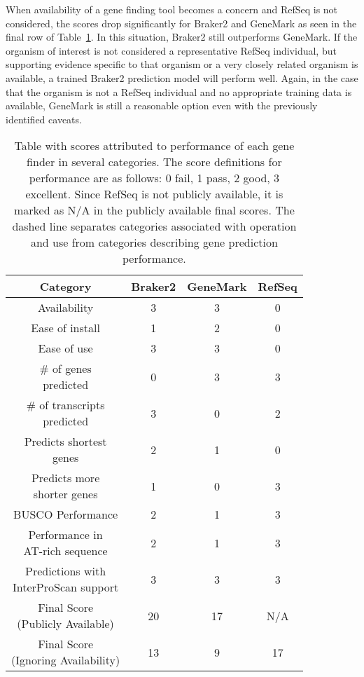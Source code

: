 When availability of a gene finding tool becomes a concern and RefSeq
is not considered, the scores drop significantly for Braker2 and
GeneMark as seen in the final row of Table~\ref{table:final-score}. In
this situation, Braker2 still outperforms GeneMark. If the organism of
interest is not considered a representative RefSeq individual, but
supporting evidence specific to that organism or a very closely
related organism is available, a trained Braker2 prediction model will
perform well. Again, in the case that the organism is not a RefSeq
individual and no appropriate training data is available, GeneMark is
still a reasonable option even with the previously identified caveats.

\begin{table}
  \centering
  \begin{tabular}{|c|c|c|c|}
    \hline
    Category & Braker2 & GeneMark & RefSeq \\ \hline
    Availability & 3 & 3 & 0 \\ \hline
    Ease of install & 1 & 2 & 0 \\ \hline
    Ease of use & 3 & 3 & 0 \\ \hdashline
    \makecell{\# of genes\\predicted} & 0 & 3 & 3 \\ \hline
    \makecell{\# of transcripts\\predicted} & 3 & 0 & 2 \\ \hline
    \makecell{Predicts shortest\\genes} & 2 & 1 & 0 \\ \hline
    \makecell{Predicts more\\shorter genes} & 1 & 0 & 3 \\ \hline
    BUSCO Performance & 2 & 1 & 3 \\ \hline
    \makecell{Performance in\\AT-rich sequence} & 2 & 1 & 3 \\ \hline
    \makecell{Predictions with \\InterProScan support} & 3 & 3 & 3 \\ \hline
    \makecell{Final Score\\(Publicly Available)} & 20 & 17 & N/A \\ \hline
    \makecell{Final Score\\(Ignoring Availability)} & 13 & 9 & 17 \\ \hline
  \end{tabular}
  \caption[Final scoring table]{Table with scores attributed to
    performance of each gene finder in several categories. The score
    definitions for performance are as follows: 0 \- fail, 1 \- pass, 2
    \- good, 3 \- excellent. Since RefSeq is not publicly available, it is
    marked as N/A in the publicly available final scores. The dashed
    line separates categories associated with operation and use
    from categories describing gene prediction performance.}\label{table:final-score}
\end{table}

